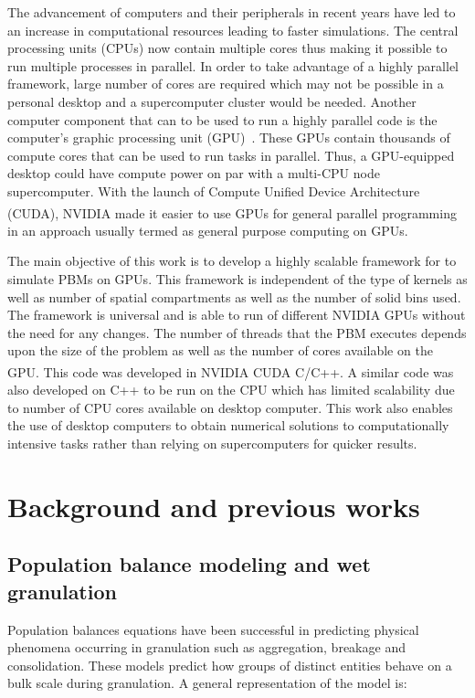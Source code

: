 \documentclass[review]{elsarticle}
\begin{document}
\begin{linenumbers}
The advancement of computers and their peripherals in recent years have led to an  
increase in computational resources leading to faster simulations. The central processing 
units (CPUs) now contain multiple cores thus making it possible to run multiple processes 
in parallel. In order to take advantage of a highly parallel framework, large number of 
cores are required  which may not be possible in a personal desktop and a supercomputer 
cluster would be needed. Another computer component that can to be used to run a highly 
parallel code is the computer's graphic processing unit (GPU)~\citep{Prakash2013b}. 
These GPUs contain thousands of compute cores that can be used to run tasks in parallel. 
Thus, a GPU-equipped desktop could have compute power on par with a multi-CPU node
supercomputer. With the launch of Compute Unified Device Architecture 
(CUDA\textsuperscript{\tiny\textregistered}), 
NVIDIA\textsuperscript{\tiny\textregistered} made it easier to use GPUs for 
general parallel programming in an approach usually termed as general purpose computing on GPUs.

The main objective of this work is to develop a highly scalable framework for to simulate 
PBMs on GPUs. This framework is independent of the type of kernels as well as number 
of spatial compartments as well as the number of solid bins used. The framework is
universal and is able to run of different NVIDIA GPUs without the need for any changes. 
The number of threads that the PBM executes depends upon the size of the problem as well as 
the number of cores available on the GPU. This code was developed in 
NVIDIA\textsuperscript{\tiny\textregistered} 
CUDA\textsuperscript{\tiny\textregistered} C/C++. 
A similar code was also developed on C++ to be run on the CPU which has limited scalability 
due to number of CPU cores available on desktop computer. This work also enables the use of 
desktop computers to obtain numerical solutions to computationally intensive tasks rather 
than relying on supercomputers for quicker results.


\section{Background and previous works}
\label{secBkgd}
\subsection{Population balance modeling and wet granulation}

Population balances equations have been successful in 
predicting physical phenomena occurring in granulation such as aggregation, breakage and 
consolidation. These models predict how groups of distinct entities  behave on a bulk 
scale during granulation. A general representation of the model is:


\end{linenumbers}
\end{document}
